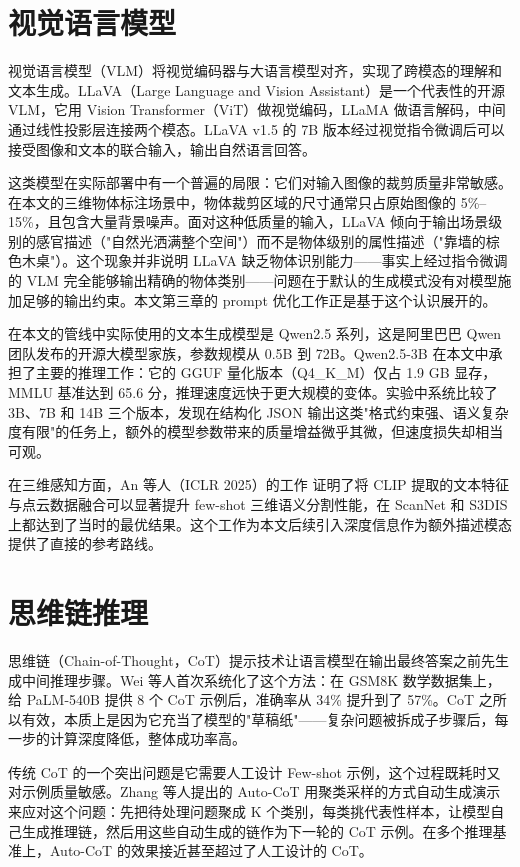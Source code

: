 
\section{视觉语言模型}

视觉语言模型（VLM）将视觉编码器与大语言模型对齐，实现了跨模态的理解和文本生成。LLaVA\cite{llava}（Large Language and Vision Assistant）是一个代表性的开源 VLM，它用 Vision Transformer（ViT）做视觉编码，LLaMA 做语言解码，中间通过线性投影层连接两个模态。LLaVA v1.5 的 7B 版本经过视觉指令微调后可以接受图像和文本的联合输入，输出自然语言回答。

这类模型在实际部署中有一个普遍的局限：它们对输入图像的裁剪质量非常敏感。在本文的三维物体标注场景中，物体裁剪区域的尺寸通常只占原始图像的 5\%--15\%，且包含大量背景噪声。面对这种低质量的输入，LLaVA 倾向于输出场景级别的感官描述（"自然光洒满整个空间"）而不是物体级别的属性描述（"靠墙的棕色木桌"）。这个现象并非说明 LLaVA 缺乏物体识别能力——事实上经过指令微调的 VLM 完全能够输出精确的物体类别——问题在于默认的生成模式没有对模型施加足够的输出约束。本文第三章的 prompt 优化工作正是基于这个认识展开的。

在本文的管线中实际使用的文本生成模型是 Qwen2.5\cite{qwen2_5} 系列，这是阿里巴巴 Qwen 团队发布的开源大模型家族，参数规模从 0.5B 到 72B。Qwen2.5-3B 在本文中承担了主要的推理工作：它的 GGUF 量化版本（Q4\_K\_M）仅占 1.9 GB 显存，MMLU 基准达到 65.6 分，推理速度远快于更大规模的变体。实验中系统比较了 3B、7B 和 14B 三个版本，发现在结构化 JSON 输出这类"格式约束强、语义复杂度有限"的任务上，额外的模型参数带来的质量增益微乎其微，但速度损失却相当可观。

在三维感知方面，An 等人（ICLR 2025）的工作\cite{multimodal_3d} 证明了将 CLIP 提取的文本特征与点云数据融合可以显著提升 few-shot 三维语义分割性能，在 ScanNet 和 S3DIS 上都达到了当时的最优结果。这个工作为本文后续引入深度信息作为额外描述模态提供了直接的参考路线。

\section{思维链推理}

思维链（Chain-of-Thought，CoT）提示技术让语言模型在输出最终答案之前先生成中间推理步骤。Wei 等人首次系统化了这个方法：在 GSM8K 数学数据集上，给 PaLM-540B 提供 8 个 CoT 示例后，准确率从 34\% 提升到了 57\%。CoT 之所以有效，本质上是因为它充当了模型的"草稿纸"——复杂问题被拆成子步骤后，每一步的计算深度降低，整体成功率高。

传统 CoT 的一个突出问题是它需要人工设计 Few-shot 示例，这个过程既耗时又对示例质量敏感。Zhang 等人提出的 Auto-CoT\cite{auto_cot} 用聚类采样的方式自动生成演示来应对这个问题：先把待处理问题聚成 K 个类别，每类挑代表性样本，让模型自己生成推理链，然后用这些自动生成的链作为下一轮的 CoT 示例。在多个推理基准上，Auto-CoT 的效果接近甚至超过了人工设计的 CoT。

